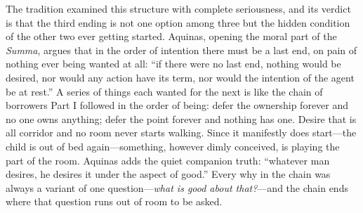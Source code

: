 The tradition examined this structure with complete seriousness, and its verdict is that the third ending is not one option among three but the hidden condition of the other two ever getting started. Aquinas, opening the moral part of the \emph{Summa}, argues that in the order of intention there must be a last end, on pain of nothing ever being wanted at all: ``if there were no last end, nothing would be desired, nor would any action have its term, nor would the intention of the agent be at rest.'' A series of things each wanted for the next is like the chain of borrowers Part I followed in the order of being: defer the ownership forever and no one owns anything; defer the point forever and nothing has one. Desire that is all corridor and no room never starts walking. Since it manifestly does start---the child is out of bed again---something, however dimly conceived, is playing the part of the room. Aquinas adds the quiet companion truth: ``whatever man desires, he desires it under the aspect of good.'' Every why in the chain was always a variant of one question---\emph{what is good about that?}---and the chain ends where that question runs out of room to be asked.

